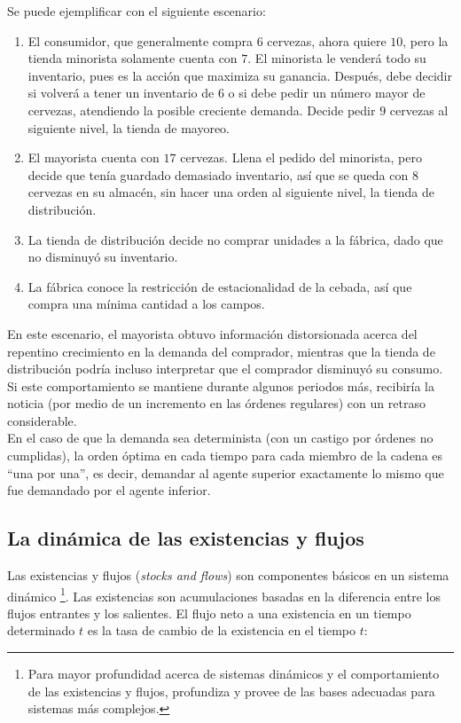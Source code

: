 Se puede ejemplificar con el siguiente escenario:

\begin{enumerate}
    \item El consumidor, que generalmente compra $6$ cervezas, ahora quiere $10$, pero la tienda minorista solamente cuenta con $7$. El minorista le venderá todo su inventario, pues es la acci\'on que maximiza su ganancia. Despu\'es, debe decidir si volverá a tener un inventario de $6$ o si debe pedir un número mayor de cervezas, atendiendo la posible creciente demanda. Decide pedir $9$ cervezas al siguiente nivel, la tienda de mayoreo.
    \item El mayorista cuenta con $17$ cervezas. Llena el pedido del minorista, pero decide que ten\'ia guardado demasiado inventario, as\'i que se queda con $8$ cervezas en su almac\'en, sin hacer una orden al siguiente nivel, la tienda de distribución.
    \item La tienda de distribuci\'on decide no comprar unidades a la f\'abrica, dado que no disminuy\'o su inventario.
    \item La f\'abrica conoce la restricci\'on de estacionalidad de la cebada, as\'i que compra una m\'inima cantidad a los campos.
\end{enumerate}

En este escenario, el mayorista obtuvo informaci\'on distorsionada acerca del repentino crecimiento en la demanda del comprador, mientras que la tienda de distribución podr\'ia incluso interpretar que el comprador disminuy\'o su consumo. Si este comportamiento se mantiene durante algunos periodos m\'as, recibir\'ia la noticia (por medio de un incremento en las \'ordenes regulares) con un retraso considerable.\\

En el caso de que la demanda sea determinista (con un castigo por \'ordenes no cumplidas), la orden \'optima en cada tiempo para cada miembro de la cadena es ``una por una'', es decir, demandar al agente superior exactamente lo mismo que fue demandado por el agente inferior.

\subsection{La din\'amica de las existencias y flujos}

Las existencias y flujos (\textit{stocks and flows}) son componentes b\'asicos en un sistema din\'amico \footnote{Para mayor profundidad acerca de sistemas din\'amicos y el comportamiento de las existencias y flujos, \citet{Sterman} profundiza y provee de las bases adecuadas para sistemas m\'as complejos.}. Las existencias son acumulaciones basadas en la diferencia entre los flujos entrantes y los salientes. El flujo neto a una existencia en un tiempo determinado $t$ es la tasa de cambio de la existencia en el tiempo $t$:

